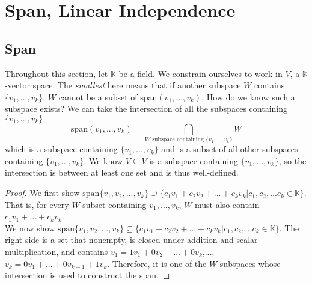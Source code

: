 \section{Span, Linear Independence}
\subsection{Span}
Throughout this section, let $\mathbb{K}$ be a field. We constrain ourselves to work in $V$, a $\mathbb{K}$-vector space.
The \textit{smallest} here means that if another subspace $W$ contains $\{v_1,...,v_k\}$, $W$ cannot be a subset of $\textrm{span}(v_1,...,v_k)$. How do we know such a subspace exists? We can take the intersection of all the subspaces containing $\{v_1,...,v_k\}$ \[
\textrm{span}(v_1,...,v_k) = \bigcap_{W \textrm{ subspace containing } \{v_1,...,v_k\}} W
\]
which is a subspace containing $\{v_1,...,v_k\}$ and is a subset of all other subspaces containing $\{v_1,...,v_k\}$. We know $V\subseteq V$ is a subspace containing $\{v_1,...,v_k\}$, so the intersection is between at least one set and is thus well-defined.
\begin{proof}
	We first show $\textrm{span}\{v_1, v_2, ... , v_k\} \supseteq \{c_1v_1 + c_2v_2 + ... + c_kv_k | c_1, c_2, ... c_k \in \mathbb{K}\}$. That is, for every $W$ subset containing $v_1,...,v_k$, $W$ must also contain $c_1v_1+...+c_kv_k$. \\
	We now show $\textrm{span}\{v_1, v_2, ... , v_k\} \subseteq \{c_1v_1 + c_2v_2 + ... + c_kv_k | c_1, c_2, ... c_k \in \mathbb{K}\}$. The right side is a set that nonempty, is closed under addition and scalar multiplication, and contains $v_1= 1v_1+0v_2+...+0v_k$,...,$v_k=0v_1+...+0v_{k-1}+1v_k$. Therefore, it is one of the $W$ subspaces whose intersection is used to construct the span.
\end{proof}


